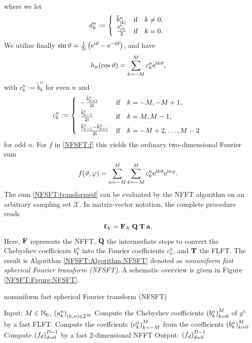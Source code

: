 where we let
\begin{align}
  d_{k}^n :=
    \left\{\begin{array}{l@{\quad \text{if} \quad}l}
      \tilde{b}_{|k|}^n & k \neq 0,\\
      \frac{b_{|0|}^n}{2} & k = 0.
    \end{array}\right. 
\end{align}
We utilize finally $\sin \vartheta = \frac{1}{2\mbox{\scriptsize\rm{i}}} \left(\mbox{\rm{e}}^{\mbox{\scriptsize\rm{i}} \vartheta} - \mbox{\rm{e}}^{-\mbox{\scriptsize\rm{i}} \vartheta}\right)$, and have
\[
  h_{n}{\hspace{-0.4ex}}\left(\cos\vartheta\right) = \sum_{k=-M}^{M} c_{k}^n \mbox{\rm{e}}^{\mbox{\scriptsize\rm{i}} k \vartheta},
\]
with $c_{k}^n := \tilde{b}_{k}^n$ for even $n$ and
\[
  c_{k}^n :=  
  \left\{\begin{array}{l@{\quad \text{if} \quad}l}
    - \frac{\tilde{b}_{k+1}^n}{2\im} & k = -M,-M+1,\\[1ex]
      \frac{\tilde{b}_{k-1}^n}{2\im} & k = M,M-1,\\[1ex]
      \frac{\tilde{b}_{k-1}^n - \tilde{b}_{k+1}^n}{2\im} & k = -M+2,\dots,M-2
  \end{array} \right.
\]
for odd $n$. For $f$ in \eqref{NFSFT:f} this yields the ordinary two-dimensional Fourier sum
\begin{equation}
  \label{NFSFT:transformed}
  f{\hspace{-0.4ex}}\left(\vartheta,\varphi\right) = \sum_{n=-M}^{M} \sum_{k=-M}^M c_{k}^n \mbox{\rm{e}}^{\mbox{\scriptsize\rm{i}} k \vartheta} \mbox{\rm{e}}^{\mbox{\scriptsize\rm{i}} n \varphi}.
\end{equation}
The sum \eqref{NFSFT:transformed} can be evaluated by the NFFT algorithm on an arbitrary sampling set $\mathcal{X}$.
In matrix-vector notation, the complete procedure reads
\begin{equation}
  \label{NFSFT:fastFactorization}
  \mathbf{f}_{\mathcal{X}} = \mathbf{F}_{\mathcal{X}} \: \mathbf{Q} \: \mathbf{T} \: \mathbf{a}.
\end{equation}
Here, $\mathbf{F}$ represents the NFFT, $\mathbf{Q}$ the intermediate steps to convert the Chebyshev coefficients $b_{k}^n$ 
into the Fourier coefficients $c_{k}^n$, and $\mathbf{T}$ the FLFT. The result is Algorithm \ref{NFSFT:Algorithm:NFSFT} denoted as 
\emph{nonuniform fast spherical Fourier transform (NFSFT)}. A schematic overview is given in Figure \ref{NFSFT:Figure:NFSFT}.
\begin{algorithm}[tb]
  \caption{nonuniform fast spherical Fourier transform (NFSFT)}
  \label{NFSFT:Algorithm:NFSFT}    
  \begin{algorithmic}
    \STATE Input:  $M \in \mathbb{N}_{0}$, $\left(a_k^n\right)_{(k,n) \in \mathcal{I}^M}$
      \STATE Compute the Chebyshev coefficients $\left(b_{k}^n\right)_{k=0}^{M}$ of $g^{n}$ by a fast FLFT.
      \STATE Compute the coeffcients $\left(c_{k}^n\right)_{k=-M}^M$ from the coefficients $\left(b_{k}^n\right)_{k=0}^{M}$ 
    \ENDFOR
    \STATE Compute $\left(f_{d}\right)_{d=0}^{D-1}$ by a fast 2-dimensional NFFT
    \STATE Output: $\left(f_{d}\right)_{d=0}^{D-1}$
\end{algorithmic}
\end{algorithm}

